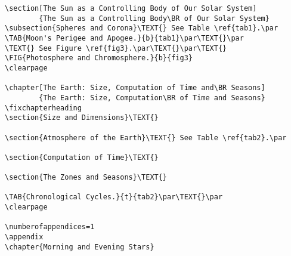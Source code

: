 \begin{verbatim}
\section[The Sun as a Controlling Body of Our Solar System]
        {The Sun as a Controlling Body\BR of Our Solar System}
\subsection{Spheres and Corona}\TEXT{} See Table \ref{tab1}.\par
\TAB{Moon's Perigee and Apogee.}{b}{tab1}\par\TEXT{}\par
\TEXT{} See Figure \ref{fig3}.\par\TEXT{}\par\TEXT{}
\FIG{Photosphere and Chromosphere.}{b}{fig3}
\clearpage

\chapter[The Earth: Size, Computation of Time and\BR Seasons]
        {The Earth: Size, Computation\BR of Time and Seasons}
\fixchapterheading
\section{Size and Dimensions}\TEXT{}

\section{Atmosphere of the Earth}\TEXT{} See Table \ref{tab2}.\par

\section{Computation of Time}\TEXT{}

\section{The Zones and Seasons}\TEXT{}

\TAB{Chronological Cycles.}{t}{tab2}\par\TEXT{}\par
\clearpage

\numberofappendices=1
\appendix
\chapter{Morning and Evening Stars}


\end{verbatim}
